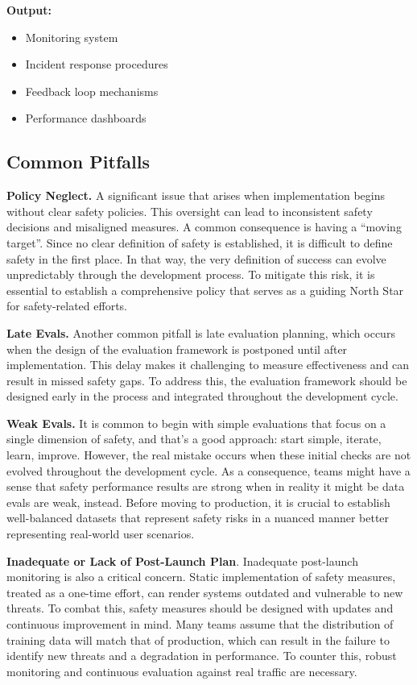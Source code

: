 \textbf{Output:}
\begin{itemize}
    \item Monitoring system
    \item Incident response procedures
    \item Feedback loop mechanisms
    \item Performance dashboards
\end{itemize}

\subsection{Common Pitfalls}

\textbf{Policy Neglect.} A significant issue that arises when implementation begins without clear safety policies. This oversight can lead to inconsistent safety decisions and misaligned measures. A common consequence is having a ``moving target''. Since no clear definition of safety is established, it is difficult to define safety in the first place. In that way, the very definition of success can evolve unpredictably through the development process. To mitigate this risk, it is essential to establish a comprehensive policy that serves as a guiding North Star for safety-related efforts.

\textbf{Late Evals.} Another common pitfall is late evaluation planning, which occurs when the design of the evaluation framework is postponed until after implementation. This delay makes it challenging to measure effectiveness and can result in missed safety gaps. To address this, the evaluation framework should be designed early in the process and integrated throughout the development cycle.

\textbf{Weak Evals.} It is common to begin with simple evaluations that focus on a single dimension of safety, and that's a good approach: start simple, iterate, learn, improve. However, the real mistake occurs when these initial checks are not evolved throughout the development cycle. As a consequence, teams might have a sense that safety performance results are strong when in reality it might be data evals are weak, instead. Before moving to production, it is crucial to establish well-balanced datasets that represent safety risks in a nuanced manner better representing real-world user scenarios.

\textbf{Inadequate or Lack of Post-Launch Plan}. Inadequate post-launch monitoring is also a critical concern. Static implementation of safety measures, treated as a one-time effort, can render systems outdated and vulnerable to new threats. To combat this, safety measures should be designed with updates and continuous improvement in mind. Many teams assume that the distribution of training data will match that of production, which can result in the failure to identify new threats and a degradation in performance. To counter this, robust monitoring and continuous evaluation against real traffic are necessary.

